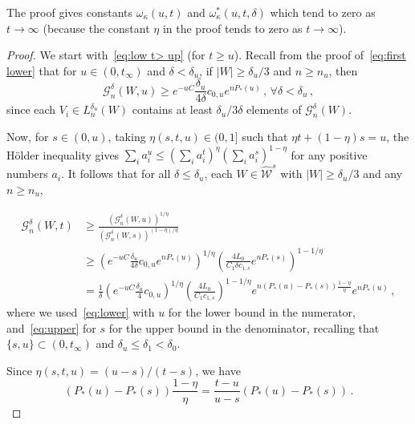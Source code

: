 \documentclass[AHL,Unicode,longabstracts,published]{cedram}
\newcommand{\cG}{\mathcal{G}}
\newcommand{\cW}{\mathcal{W}}
\newcommand{\hW}{\widehat{\cW}}
\let\oldforall\forall
\renewcommand*{\forall}{\mathrel{\oldforall}}
\begin{document}
The proof gives constants $\omega_\kappa(u,t)$ and $\omega_\kappa^*(u,t,\delta)$ which tend to zero as $t\to \infty$ (because the constant $\eta$ in the proof tends to zero as $t\to \infty$).

\begin{proof}
We start with~\eqref{eq:low t> up} (for $t \ge u$). Recall from the proof of~\eqref{eq:first lower} that for $u \in (0, t_\infty)$ and $\delta < \delta_u$, if $|W| \ge \delta_u/3$ and $n\ge n_u$, then
\begin{equation}\label{eq:lower}
\cG_n^\delta(W,u) \ge e^{-u C} \frac{\delta_u}{4 \delta} c_{0,u} e^{n P_*(u)} \,,\, \forall \delta < \delta_u \,,
\end{equation}
since each $V_i \in L_n^{\delta_u}(W)$ contains at least ${\delta_u}/{3\delta}$ elements of $\cG_n^\delta(W)$.


Now, for $s \in (0,u)$, taking $\eta(s,t,u)\in (0,1]$ such that $\eta t + (1-\eta)s = u$, the H\"older inequality gives $\sum_i a_i^{u}\le (\sum_i a_i^t )^\eta (\sum_i a_i^{s} )^{1-\eta} $ for any positive numbers $a_i$. It follows that for all $\delta {\le \delta_{u} }$, each $W \in \hW^s$ with $|W| \ge \delta_{u}/3$ and any $n \ge n_{u}$,

\begin{equation}
\begin{split}
\cG_n^\delta(W,t) &\ge \frac{(
\cG_n^\delta(W,u))^{1/\eta}} {(\cG_n^\delta(W,s))^{(1-\eta)/\eta}}\\
&\ge \left(e^{-u C} \frac{ \delta_{u}}{4 \delta} c_{0,u} e^{n P_*(u)} \right)^{1/\eta}
\left({ \frac{ 4L_0 }{C_1 \delta c_{1,s}} } e^{n P_*(s)} \right)^{1 - 1/\eta} \\
& = \frac{1}{\delta}
\left(e^{-u C} \frac{\delta_{u}}{4} c_{0,u} \right)^{1/\eta}
\left ({ \frac{4 L_0 }{ C_1 c_{1,s}} } \right)^{1-1/\eta} e^{n \left(P_*(u) - P_*(s)\right)\frac{1-\eta}{\eta} } e^{n P_*(u)} \,,
\end{split}
\end{equation}
where we used~\eqref{eq:lower} with $u$ for the lower bound in the numerator, and~\eqref{eq:upper} for $s$ for the upper bound in the denominator, recalling that $\{s,u\} \subset (0, t_\infty)$ and $\delta_{u} \le \delta_1 < \delta_0$.

Since $\eta (s,t,u)= ({u-s})/({t-s})$, we have
\begin{equation*}
\left(P_*(u) - P_*(s)\right)\frac {1-\eta}{\eta}=\frac {t-u}{u-s} \left(P_*(u)-P_*(s)\right) \,.
\end{equation*}



\end{proof}
\end{document}
